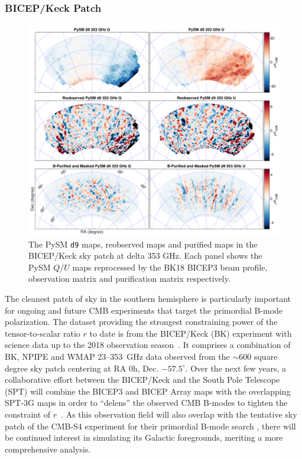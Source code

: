 \documentclass[twocolumn]{aastex631}
\begin{document}
\subsubsection{BICEP/Keck Patch}
\label{sec:BK_validation}
\begin{figure}
    \centering
    \includegraphics[width=2.\columnwidth]{figures/pysm_d9_353_delta_reobs_B_pub.pdf}
    \caption{The PySM \texttt{d9} maps, reobserved maps and purified maps in the BICEP/Keck sky patch at delta 353 GHz. Each panel shows the
    PySM $Q$/$U$ maps reprocessed by the BK18 BICEP3 beam profile, observation matrix and purification matrix respectively.}
    \label{fig:psym_BKmatrix}
\end{figure}

The cleanest patch of sky in the southern hemisphere is particularly important for ongoing and future CMB experiments that target the primordial B-mode polarization. The dataset providing the strongest constraining power of the tensor-to-scalar ratio $r$ to date is from the BICEP/Keck (BK) experiment with science data up to the 2018 observation season~\citep[``BK18'';][]{Ade:2021}. It comprises a combination of BK, NPIPE and WMAP 23--353~GHz data observed from the $\sim 600$ square degree sky patch centering at RA 0h, Dec. $-57.5^{\circ}$. Over the next few years, a collaborative effort between the BICEP/Keck and the South Pole Telescope (SPT) will combine the BICEP3 and BICEP Array maps with the overlapping SPT-3G maps in order to ``delens'' the observed CMB B-modes to tighten the constraint of $r$~\citep{BICEP/KeckCollaboration:2022}. As this observation field will also overlap with the tentative sky patch of the CMB-S4 experiment for their primordial B-mode search \citep{Abazajian:2022}, there will be continued interest in simulating its Galactic foregrounds, meriting a more comprehensive analysis. 
\end{document}
